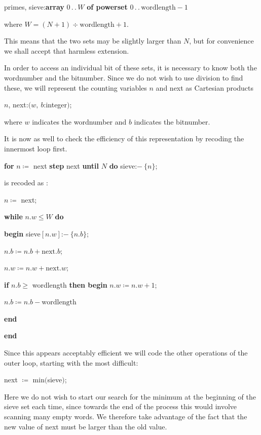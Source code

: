\documentclass[twoside,11pt]{book}
\begin{document}
\quad primes, sieve:\textbf{array} $0\,.\,.\,W$ \textbf{of powerset} $0\,.\,.\,\text{wordlength} - 1$

\noindent
where $W = (N + 1) \div \text{wordlength} + 1$.

\noindent
This means that the two sets may be slightly larger than $N$, but for convenience we shall accept that harmless extension.

In order to access an individual bit of these sets, it is necessary to know both the wordnumber and the bitnumber. Since we do not wish to use division to find these, we will represent the counting variables $n$ and next as Cartesian products

\quad $n$, next:$(w,\ b$:integer$)$;

\noindent
where $w$ indicates the wordnumber and $b$ indicates the bitnumber.

It is now as well to check the efficiency of this representation by recoding the innermost loop first.

\quad \textbf{for} $n\coloneq$ next \textbf{step} next \textbf{until} $N$ \textbf{do} sieve:$-\ \{n\}$;

\noindent
is recoded as :

\quad $n\coloneq$ next;

\quad \textbf{while} $n.w \leqslant W$ \textbf{do}

\quad \quad \textbf{begin} sieve$[n.w]$:$-\ \{n.b\}$;

\quad \quad \quad $n.b\coloneq n.b + \text{next}.b$;

\quad \quad \quad $n.w\coloneq n.w + \text{next}.w;$

\quad \quad \quad \textbf{if} $n.b \geqslant$ wordlength \textbf{then begin} $n.w \coloneq n.w + 1$;

\quad \quad \quad \quad $n.b \coloneq n.b - \text{wordlength}$

\quad \quad \quad \textbf{end}

\quad \quad \textbf{end}

\noindent
Since this appears acceptably efficient we will code the other operations of the outer loop, starting with the most difficult:

\quad next $\coloneq$ min$($sieve$)$;

\noindent
Here we do not wish to start our search for the minimum at the beginning of the sieve set each time, since towards the end of the process this would involve scanning many empty words. We therefore take advantage of the fact that the new value of next must be larger than the old value.
\end{document}
